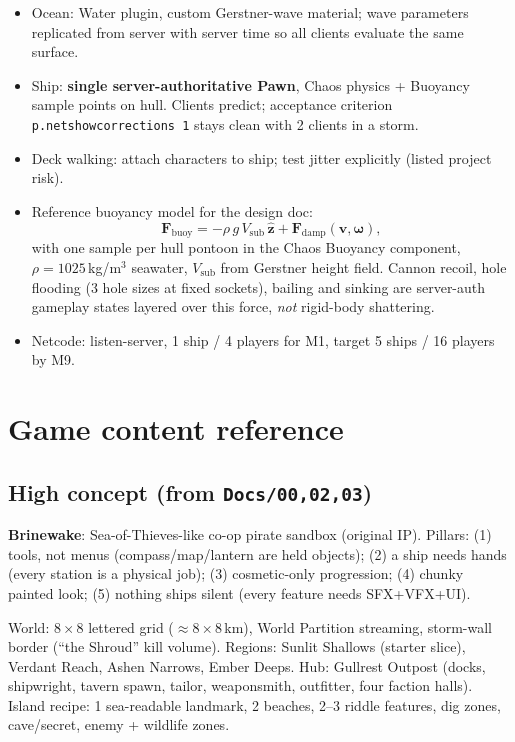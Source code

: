 \documentclass[11pt,a4paper]{article}
\begin{document}
\begin{itemize}[leftmargin=1.4em]
  \item Ocean: Water plugin, custom Gerstner-wave material; wave parameters replicated from server with server time so all clients evaluate the same surface.
  \item Ship: \textbf{single server-authoritative Pawn}, Chaos physics + Buoyancy sample points on hull. Clients predict; acceptance criterion \texttt{p.netshowcorrections 1} stays clean with 2 clients in a storm.
  \item Deck walking: attach characters to ship; test jitter explicitly (listed project risk).
  \item Reference buoyancy model for the design doc:
\begin{equation}
\mathbf{F}_{\text{buoy}} = -\rho\, g\, V_{\text{sub}}\,\hat{\mathbf{z}} + \mathbf{F}_{\text{damp}}(\mathbf{v}, \boldsymbol{\omega}),
\end{equation}
  with one sample per hull pontoon in the Chaos Buoyancy component, $\rho = 1025$\,kg/m$^3$ seawater, $V_{\text{sub}}$ from Gerstner height field. Cannon recoil, hole flooding (3 hole sizes at fixed sockets), bailing and sinking are server-auth gameplay states layered over this force, \emph{not} rigid-body shattering.
  \item Netcode: listen-server, 1 ship / 4 players for M1, target 5 ships / 16 players by M9.
\end{itemize}

\section{Game content reference}
\label{sec:content}

\subsection{High concept (from \texttt{Docs/00,02,03})}
\textbf{Brinewake}: Sea-of-Thieves-like co-op pirate sandbox (original IP). Pillars: (1) tools, not menus (compass/map/lantern are held objects); (2) a ship needs hands (every station is a physical job); (3) cosmetic-only progression; (4) chunky painted look; (5) nothing ships silent (every feature needs SFX+VFX+UI).

World: $8\times8$ lettered grid ($\approx 8\times8$\,km), World Partition streaming, storm-wall border (``the Shroud'' kill volume). Regions: Sunlit Shallows (starter slice), Verdant Reach, Ashen Narrows, Ember Deeps. Hub: Gullrest Outpost (docks, shipwright, tavern spawn, tailor, weaponsmith, outfitter, four faction halls). Island recipe: 1 sea-readable landmark, 2 beaches, 2--3 riddle features, dig zones, cave/secret, enemy + wildlife zones.
\end{document}
